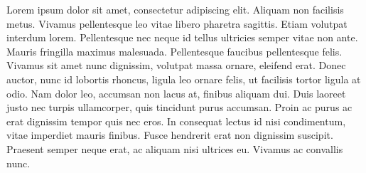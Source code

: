 Lorem ipsum dolor sit amet, consectetur adipiscing elit. Aliquam non facilisis metus. Vivamus pellentesque leo vitae libero pharetra sagittis. Etiam volutpat interdum lorem. Pellentesque nec neque id tellus ultricies semper vitae non ante. Mauris fringilla maximus malesuada. Pellentesque faucibus pellentesque felis. Vivamus sit amet nunc dignissim, volutpat massa ornare, eleifend erat. Donec auctor, nunc id lobortis rhoncus, ligula leo ornare felis, ut facilisis tortor ligula at odio. Nam dolor leo, accumsan non lacus at, finibus aliquam dui. Duis laoreet justo nec turpis ullamcorper, quis tincidunt purus accumsan. Proin ac purus ac erat dignissim tempor quis nec eros. In consequat lectus id nisi condimentum, vitae imperdiet mauris finibus. Fusce hendrerit erat non dignissim suscipit. Praesent semper neque erat, ac aliquam nisi ultrices eu. Vivamus ac convallis nunc.
